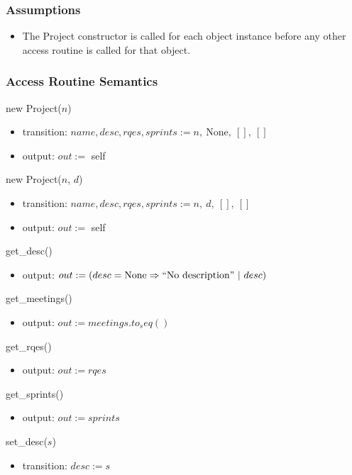 \documentclass[12pt, titlepage]{article}
\begin{document}
\subsubsection*{Assumptions}
\begin{itemize}
  \item The Project constructor is called for each object instance before any other access routine is called for that object.
\end{itemize}

\subsubsection*{Access Routine Semantics}
\noindent new Project($n$)
\begin{itemize}
    \item transition: $name, desc, rqes, sprints := n,\ \text{None},\ [],\ []$
    \item output: $out :=$ self
\end{itemize}

\noindent new Project($n$, $d$)
\begin{itemize}
    \item transition: $name, desc, rqes, sprints := n,\ d,\ [],\ []$
    \item output: $out :=$ self
\end{itemize}

\noindent get\_desc()
\begin{itemize}
    \item output: $out := (desc = \text{None} \Rightarrow ``\text{No description}"\ |\ desc)$
\end{itemize}

\noindent get\_meetings()
\begin{itemize}
    \item output: $out := meetings.to_seq()$
\end{itemize}

\noindent get\_rqes()
\begin{itemize}
    \item output: $out := rqes$
\end{itemize}

\noindent get\_sprints()
\begin{itemize}
    \item output: $out := sprints$
\end{itemize}

\noindent set\_desc($s$)
\begin{itemize}
    \item transition: $desc := s$
\end{itemize}
\end{document}
